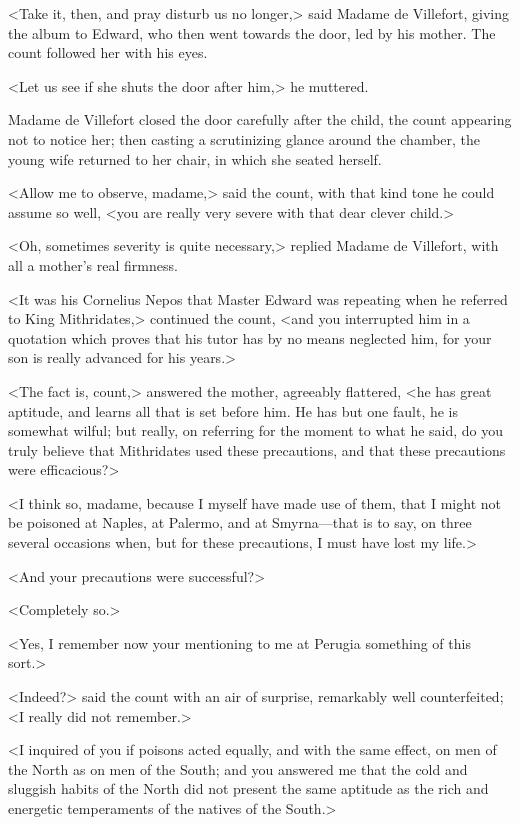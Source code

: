  <Take it, then, and pray disturb us no longer,> said Madame de Villefort, giving the album to Edward, who then went towards the door, led by his mother. The count followed her with his eyes. 

 <Let us see if she shuts the door after him,> he muttered. 

 Madame de Villefort closed the door carefully after the child, the count appearing not to notice her; then casting a scrutinizing glance around the chamber, the young wife returned to her chair, in which she seated herself. 

 <Allow me to observe, madame,> said the count, with that kind tone he could assume so well, <you are really very severe with that dear clever child.> 

 <Oh, sometimes severity is quite necessary,> replied Madame de Villefort, with all a mother's real firmness. 

 <It was his Cornelius Nepos that Master Edward was repeating when he referred to King Mithridates,> continued the count, <and you interrupted him in a quotation which proves that his tutor has by no means neglected him, for your son is really advanced for his years.> 

 <The fact is, count,> answered the mother, agreeably flattered, <he has great aptitude, and learns all that is set before him. He has but one fault, he is somewhat wilful; but really, on referring for the moment to what he said, do you truly believe that Mithridates used these precautions, and that these precautions were efficacious?> 

 <I think so, madame, because I myself have made use of them, that I might not be poisoned at Naples, at Palermo, and at Smyrna—that is to say, on three several occasions when, but for these precautions, I must have lost my life.> 

 <And your precautions were successful?> 

 <Completely so.> 

 <Yes, I remember now your mentioning to me at Perugia something of this sort.> 

 <Indeed?> said the count with an air of surprise, remarkably well counterfeited; <I really did not remember.> 

 <I inquired of you if poisons acted equally, and with the same effect, on men of the North as on men of the South; and you answered me that the cold and sluggish habits of the North did not present the same aptitude as the rich and energetic temperaments of the natives of the South.> 

